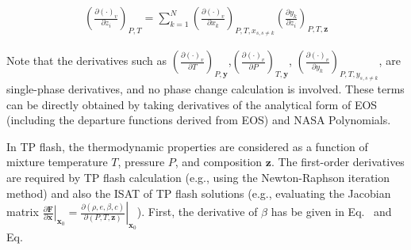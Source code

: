 \begin{align}
	\left(\frac{\partial (\cdot)_v}{\partial z_i}\right)_{P,T} =  \sum_{k=1}^N\left(\frac{\partial (\cdot)_v}{\partial x_k}\right)_{P,T,x_{s,s\neq k}}\left(\frac{\partial y_k}{\partial z_i}\right)_{P,T,\mathbf{z}} \label{eq:dvdz}
\end{align}

Note that the derivatives such as $\left(\frac{\partial (\cdot)_v}{\partial T}\right)_{P,\mathbf{y}}$,$\left(\frac{\partial (\cdot)_v}{\partial P}\right)_{T,\mathbf{y}}$, $\left(\frac{\partial (\cdot)_v}{\partial y_k}\right)_{P,T,y_{s,s\neq k}}$, are single-phase derivatives, and no phase change calculation is involved. These terms can be directly obtained by taking derivatives of the analytical form of EOS (including the departure functions derived from EOS) and NASA Polynomials.


In TP flash, the thermodynamic properties are considered as a function of mixture temperature $T$, pressure $P$, and composition $\mathbf{z}$. The first-order derivatives are required by TP flash calculation (e.g., using the Newton-Raphson iteration method) and also the ISAT of TP flash solutions (e.g., evaluating the Jacobian matrix $\left.\frac{\partial  \mathbf{F}}{\partial \mathbf{x}}\right|_{\mathbf{x}_0} = \left.\frac{\partial  \left(\rho, e, \beta, c\right)}{\partial \left(P,T,\mathbf{z}\right)}\right|_{\mathbf{x}_0}$).
First, the derivative of $\beta$ has be given in Eq.~\label{eq:dbetafPT} and Eq.~\label{eq:dbetadz}%



